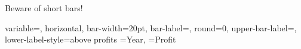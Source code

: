 \documentclass[12pt]{article}
\begin{document}
Beware of short bars! 

\DTLbarchart
{
 variable=\theProfit,
 horizontal,
 bar-width=20pt, 
 bar-label=\theYear,
 round=0,
 upper-bar-label=\DTLbarvalue,
 lower-label-style=above
}
{profits}%
 {%
 \theYear=Year,
 \theProfit=Profit
} 
\end{document}
